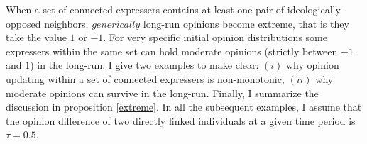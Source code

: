 \documentclass{article}
\newtheorem{example}{Example}
\begin{document}
\vspace{4mm} 

When a set of connected expressers contains at least one pair of ideologically-opposed neighbors, $generically$ long-run opinions become extreme, that is they take the value $1$ or $-1$.  For very specific initial opinion distributions some expressers within the same set can hold moderate  opinions (strictly between $-1$ and $1$) in the long-run. I give two examples to make clear: $(i)$ why opinion updating within a set of connected expressers is non-monotonic, $(ii)$ why moderate opinions can survive in the long-run. Finally, I summarize the discussion in proposition \ref{extreme}. In all the subsequent examples, I assume that the opinion difference of two directly linked individuals at a given time period is $\tau=0.5$. 
\end{document}
